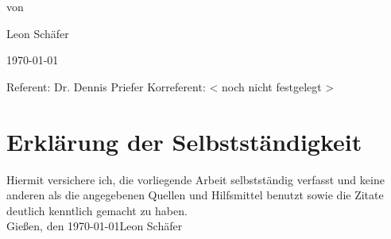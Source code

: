 \begin{titlepage}
\begin{center}
von
\par\end{center}

\begin{center}
Leon Schäfer
\par\end{center}

\begin{center}
\today
\par\end{center}

\vspace{1.5cm}


Referent: Dr. Dennis Priefer
Korreferent: < noch nicht festgelegt >

\end{titlepage}


\thispagestyle{empty}
\chapter*{Erklärung der Selbstständigkeit}
\thispagestyle{empty}
Hiermit versichere ich, die vorliegende Arbeit selbstständig verfasst und keine anderen als die angegebenen Quellen und Hilfsmittel benutzt sowie die Zitate deutlich kenntlich gemacht zu haben.
\vspace{4\baselineskip}\\
Gießen, den \today \hfill Leon Schäfer
\vspace{4\baselineskip}\\
\clearpage
\mbox{}\thispagestyle{empty}

